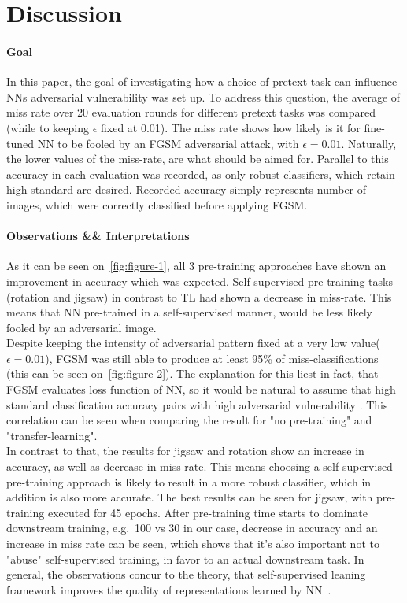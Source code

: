 \section{Discussion}

\paragraph{Goal}In this paper,
the goal of investigating how a choice of pretext task can influence NNs adversarial vulnerability was set up.
To address this question, the average of miss rate over 20 evaluation rounds for different pretext tasks was compared
(while to keeping $\epsilon$ fixed at 0.01).
The miss rate shows how likely is it for fine-tuned NN to be fooled by an FGSM adversarial attack,
with $\epsilon = 0.01$.
Naturally, the lower values of the miss-rate, are what should be aimed for.
Parallel to this accuracy in each evaluation was recorded, as only robust classifiers, which retain high standard
are desired.
Recorded accuracy simply represents number of images, which were correctly classified before applying FGSM.

\paragraph{Observations \&\& Interpretations} As it can be seen on~\ref{fig:figure-1},
all 3 pre-training approaches have shown an improvement in accuracy which was expected.
Self-supervised pre-training tasks (rotation and jigsaw) in contrast to TL had shown a decrease
in miss-rate.
This means that NN pre-trained in a self-supervised manner, would be less likely fooled by an adversarial image.
\\
Despite keeping the intensity of adversarial pattern fixed at a very low value($\epsilon = 0.01$),
FGSM was still able to produce at least 95\% of miss-classifications (this can be seen on~\ref{fig:figure-2}).
The explanation for this liest in fact, that FGSM evaluates loss function of NN,
so it would be natural to assume that high standard classification accuracy pairs with high adversarial vulnerability
\cite{https://doi.org/10.48550/arxiv.1805.12152}.
This correlation can be seen when comparing the result for "no pre-training" and "transfer-learning".
\\
In contrast to that, the results for jigsaw and rotation show an increase in accuracy, as well
as decrease in miss rate.
This means choosing a self-supervised pre-training approach is likely to result in a more robust classifier,
which in addition is also more accurate.
The best results can be seen for jigsaw, with pre-training executed for 45 epochs.
After pre-training time starts to dominate downstream training, e.g.\ 100 vs 30 in our case,
decrease in accuracy and an increase in miss rate can be seen, which shows that it's also important
not to "abuse" self-supervised training, in favor to an actual downstream task.
In general, the observations concur to the theory,
that self-supervised leaning framework improves the quality of representations
learned by NN~\cite{kolesnikov2019revisiting}.


